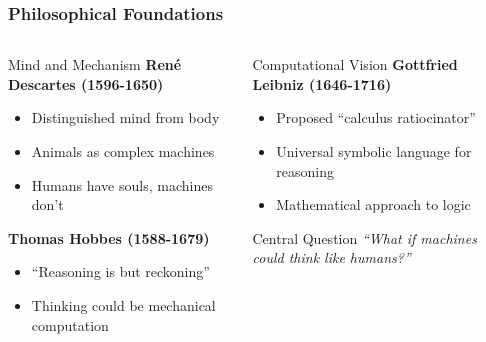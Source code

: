 \documentclass{beamer}
\begin{document}
\begin{frame}
    \frametitle{Philosophical Foundations}
    \begin{columns}
        \begin{column}{0.48\textwidth}
            \begin{block}{Mind and Mechanism}
                \textbf{René Descartes (1596-1650)}
                \begin{itemize}
                    \item Distinguished mind from body
                    \item Animals as complex machines
                    \item Humans have souls, machines don't
                \end{itemize}
                
                \textbf{Thomas Hobbes (1588-1679)}
                \begin{itemize}
                    \item ``Reasoning is but reckoning''
                    \item Thinking could be mechanical computation
                \end{itemize}
            \end{block}
        \end{column}
        \begin{column}{0.48\textwidth}
            \begin{alertblock}{Computational Vision}
                \textbf{Gottfried Leibniz (1646-1716)}
                \begin{itemize}
                    \item Proposed ``calculus ratiocinator''
                    \item Universal symbolic language for reasoning
                    \item Mathematical approach to logic
                \end{itemize}
            \end{alertblock}
            
            \begin{exampleblock}{Central Question}
                \textit{``What if machines could think like humans?''}
            \end{exampleblock}
        \end{column}
    \end{columns}
\end{frame}
\end{document}
